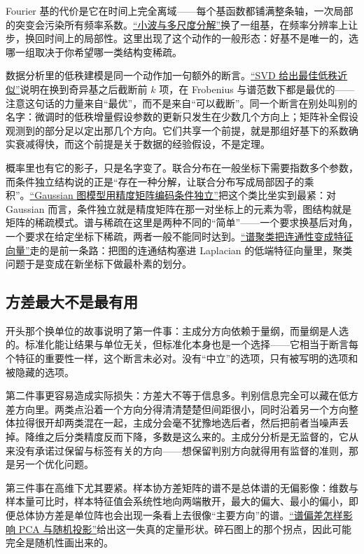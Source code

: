 Fourier 基的代价是它在时间上完全离域——每个基函数都铺满整条轴，一次局部的突变会污染所有频率系数。\hyperref[sec:08-Numerical-Analysis/08-Fourier-and-Spectral-Methods/06]{``小波与多尺度分解''}换了一组基，在频率分辨率上让步，换回时间上的局部性。这里出现了这个动作的一般形态：好基不是唯一的，选哪一组取决于你希望哪一类结构变稀疏。

数据分析里的低秩建模是同一个动作加一句额外的断言。\hyperref[sec:13-Machine-Learning/04-Dimensionality-Reduction/02]{``SVD 给出最佳低秩近似''}说明在换到奇异基之后截断前 \(k\) 项，在 Frobenius 与谱范数下都是最优的——注意这句话的力量来自``最优''，而不是来自``可以截断''。同一个断言在别处叫别的名字：微调时的低秩增量假设参数的更新只发生在少数几个方向上；矩阵补全假设观测到的部分足以定出那几个方向。它们共享一个前提，就是那组好基下的系数确实衰减得快，而这个前提是关于数据的经验假设，不是定理。

概率里也有它的影子，只是名字变了。联合分布在一般坐标下需要指数多个参数，而条件独立结构说的正是``存在一种分解，让联合分布写成局部因子的乘积''。\hyperref[sec:13-Machine-Learning/07-Graphical-and-Sequential-Models/02]{``Gaussian 图模型用精度矩阵编码条件独立''}把这个类比坐实到最紧：对 Gaussian 而言，条件独立就是精度矩阵在那一对坐标上的元素为零，图结构就是矩阵的稀疏模式。谱与稀疏在这里是两种不同的``简单''——一个要求换基后对角，一个要求在给定坐标下稀疏，两者一般不能同时达到。\hyperref[sec:13-Machine-Learning/05-Clustering-and-Data-Geometry/02]{``谱聚类把连通性变成特征向量''}走的是前一条路：把图的连通结构塞进 Laplacian 的低端特征向量里，聚类问题于是变成在新坐标下做最朴素的划分。

\subsection{方差最大不是最有用}

开头那个换单位的故事说明了第一件事：主成分方向依赖于量纲，而量纲是人选的。标准化能让结果与单位无关，但标准化本身也是一个选择——它相当于断言每个特征的重要性一样，这个断言未必对。没有``中立''的选项，只有被写明的选项和被隐藏的选项。

第二件事更容易造成实际损失：方差大不等于信息多。判别信息完全可以藏在低方差方向里。两类点沿着一个方向分得清清楚楚但间距很小，同时沿着另一个方向整体拉得很开却两类混在一起，主成分会毫不犹豫地选后者，然后把前者当噪声丢掉。降维之后分类精度反而下降，多数是这么来的。主成分分析是无监督的，它从来没有承诺过保留与标签有关的方向——想保留判别方向就得用有监督的准则，那是另一个优化问题。

第三件事在高维下尤其要紧。样本协方差矩阵的谱不是总体谱的无偏影像：维数与样本量可比时，样本特征值会系统性地向两端散开，最大的偏大、最小的偏小，即便总体协方差是单位阵也会出现一条看上去很像``主要方向''的谱。\hyperref[sec:11-Mathematical-Statistics/09-Random-Matrix-Theory/03]{``谱偏差怎样影响 PCA 与随机投影''}给出这一失真的定量形状。碎石图上的那个拐点，因此可能完全是随机性画出来的。

